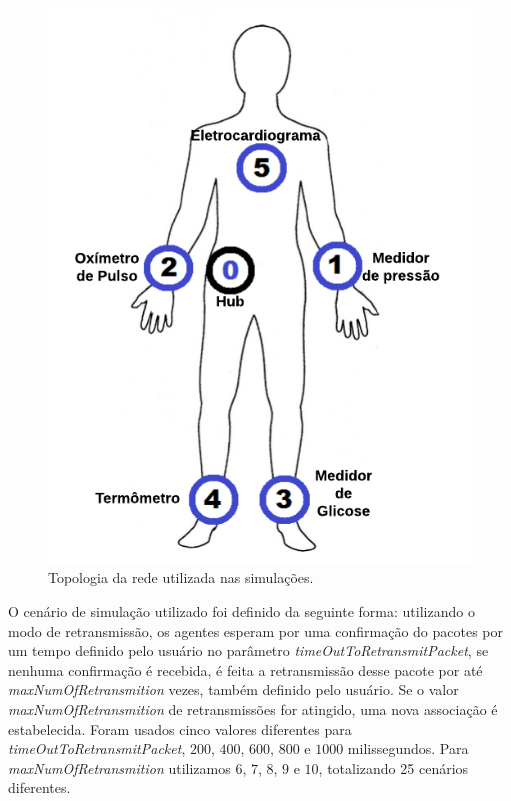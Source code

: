 
\begin{figure}[htbp]
\centering
\includegraphics[width=.3\textwidth]{figures/corpoSensoresNomes.png}
\caption{Topologia da rede utilizada nas simulações.}
\label{fig:wbantopology} 
\end{figure}

O cenário de simulação utilizado foi definido da seguinte forma: utilizando o modo de retransmissão, os agentes esperam por uma confirmação do pacotes por um tempo definido pelo usuário no parâmetro  \textit{timeOutToRetransmitPacket}, se nenhuma confirmação é recebida, é feita a retransmissão desse pacote por até \textit{maxNumOfRetransmition} vezes, também definido pelo usuário. Se o valor \textit{maxNumOfRetransmition} de retransmissões for atingido, uma nova associação é estabelecida. Foram usados cinco valores diferentes para \textit{timeOutToRetransmitPacket}, $200$, $400$, $600$, $800$ e $1000$ milissegundos. Para \textit{maxNumOfRetransmition} utilizamos $6$, $7$, $8$, $9$ e $10$, totalizando 25 cenários diferentes.

